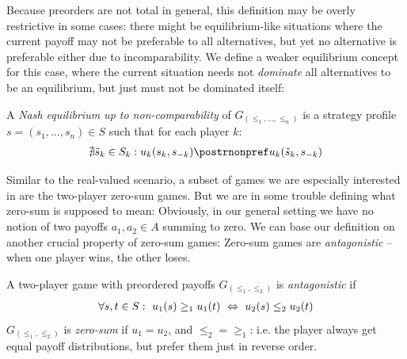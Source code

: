 \documentclass[a4paper]{scrreprt}
\begin{document}
    Because preorders are not total in general, this definition may be overly restrictive in some cases: there might be equilibrium-like situations where the current payoff may not be preferable to all alternatives, but yet no alternative is preferable either due to incomparability. We define a weaker equilibrium concept for this case, where the current situation needs not \emph{dominate} all alternatives to be an equilibrium, but just must not be dominated itself:
    \begin{defn}
        A \emph{Nash equilibrium up to non-comparability} of $G_{(\leq_1, \dots, \leq_n)}$
        is a strategy profile $s = (s_1, \dots, s_n) \in S$ such that for each player $k$:
        \begin{gather}
            \nexists \tilde{s}_k \in S_k: u_k(s_k, s_{-k}) \postrnonpref u_k(\tilde{s}_k, s_{-k})
        \end{gather}
    \end{defn}
    
    Similar to the real-valued scenario, a subset of games we are especially interested in are the two-player zero-sum games.
    But we are in some trouble defining what zero-sum is supposed to mean: Obviously, in our general setting we have no notion of two payoffs $a_1, a_2 \in A$ summing to zero.
    We can base our definition on another crucial property of zero-sum games: Zero-sum games are \emph{antagonistic} -- when one player wins, the other loses.
    
    \begin{defn}
        A two-player game with preordered payoffs $G_{(\leq_1, \leq_2)}$ is \emph{antagonistic} if
        \begin{gather*}
            \forall s, t \in S:~ u_1(s) \geq_1 u_1(t) ~\Leftrightarrow~ u_2(s) \leq_2 u_2(t)
        \end{gather*}
        $G_{(\leq_1, \leq_2)}$ is \emph{zero-sum} if $u_1 = u_2$, and $\leq_2 {=} \geq_1$: i.e. the player always get equal payoff distributions, but prefer them just in reverse order.
    \end{defn}
    
\end{document}
